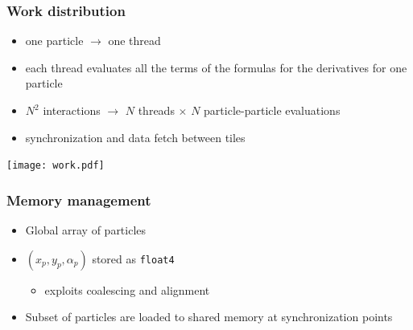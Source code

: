 \documentclass[12pt,english,dvipsnames]{beamer}
\begin{document}
  \begin{frame}
    \frametitle{Work distribution}
    \begin{itemize}
      \item one particle \(\longrightarrow\) one thread
      \item each thread evaluates all the terms
        of the formulas for the derivatives
        for one particle
      \item \(N^2\) interactions \(\longrightarrow\)
        \(N\) threads \(\times\) \(N\) particle-particle evaluations
      \item synchronization and data fetch between tiles
    \end{itemize}
  \end{frame}

  \begin{frame}
    \centering
    \texttt{[image: work.pdf]}
  \end{frame}

  \begin{frame}
    \frametitle{Memory management}
    \begin{itemize}
      \item Global array of particles
      \item \((x_p, y_p, α_p)\) stored as \texttt{float4}
        \begin{itemize}
          \item exploits coalescing and alignment
        \end{itemize}
      \item Subset of particles
        are loaded to shared memory
        at synchronization points
    \end{itemize}
  \end{frame}
\end{document}
